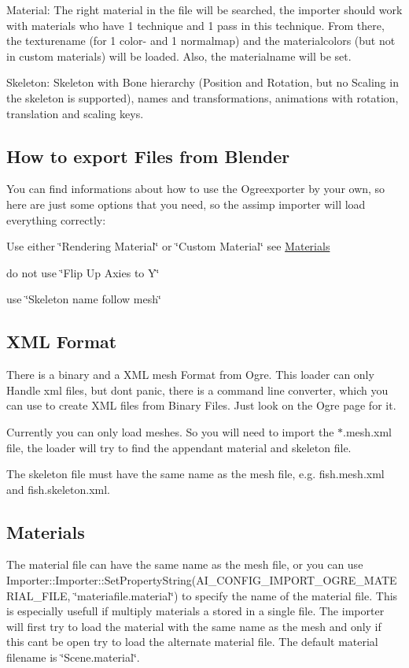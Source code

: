 Material\+: The right material in the file will be searched, the importer should work with materials who have 1 technique and 1 pass in this technique. From there, the texturename (for 1 color-\/ and 1 normalmap) and the materialcolors (but not in custom materials) will be loaded. Also, the materialname will be set.

Skeleton\+: Skeleton with Bone hierarchy (Position and Rotation, but no Scaling in the skeleton is supported), names and transformations, animations with rotation, translation and scaling keys.\hypertarget{importer_notes_export_Blender}{}\subsection{How to export Files from Blender}\label{importer_notes_export_Blender}
You can find informations about how to use the Ogreexporter by your own, so here are just some options that you need, so the assimp importer will load everything correctly\+:
\begin{DoxyItemize}
\item Use either \char`\"{}\+Rendering Material\char`\"{} or \char`\"{}\+Custom Material\char`\"{} see \hyperlink{importer_notes_material}{Materials}
\item do not use \char`\"{}\+Flip Up Axies to Y\char`\"{}
\item use \char`\"{}\+Skeleton name follow mesh\char`\"{}
\end{DoxyItemize}\hypertarget{importer_notes_xml}{}\subsection{X\+M\+L Format}\label{importer_notes_xml}
There is a binary and a X\+M\+L mesh Format from Ogre. This loader can only Handle xml files, but don\textquotesingle{}t panic, there is a command line converter, which you can use to create X\+M\+L files from Binary Files. Just look on the Ogre page for it.

Currently you can only load meshes. So you will need to import the $\ast$.mesh.\+xml file, the loader will try to find the appendant material and skeleton file.

The skeleton file must have the same name as the mesh file, e.\+g. fish.\+mesh.\+xml and fish.\+skeleton.\+xml.\hypertarget{importer_notes_material}{}\subsection{Materials}\label{importer_notes_material}
The material file can have the same name as the mesh file, or you can use Importer\+::\+Importer\+::\+Set\+Property\+String(A\+I\+\_\+\+C\+O\+N\+F\+I\+G\+\_\+\+I\+M\+P\+O\+R\+T\+\_\+\+O\+G\+R\+E\+\_\+\+M\+A\+T\+E\+R\+I\+A\+L\+\_\+\+F\+I\+L\+E, \char`\"{}materiafile.\+material\char`\"{}) to specify the name of the material file. This is especially usefull if multiply materials a stored in a single file. The importer will first try to load the material with the same name as the mesh and only if this can\textquotesingle{}t be open try to load the alternate material file. The default material filename is \char`\"{}\+Scene.\+material\char`\"{}.

